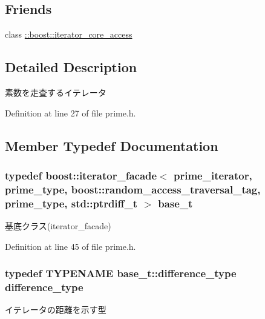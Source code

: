 \subsection*{\-Friends}
\begin{DoxyCompactItemize}
\item 
class \hyperlink{classyuh_1_1range__detail_1_1prime__iterator_a986bf0deaa7559f361d03122eeea4c86}{\-::boost\-::iterator\-\_\-core\-\_\-access}
\end{DoxyCompactItemize}


\subsection{\-Detailed \-Description}
素数を走査するイテレータ 

\-Definition at line 27 of file prime.\-h.



\subsection{\-Member \-Typedef \-Documentation}
\hypertarget{classyuh_1_1range__detail_1_1prime__iterator_af6bf48039295b29ac1f86bd776f4a29a}{
\subsubsection[{base\-\_\-t}]{\setlength{\rightskip}{0pt plus 5cm}typedef boost\-::iterator\-\_\-facade$<$ {\bf prime\-\_\-iterator}, {\bf prime\-\_\-type}, boost\-::random\-\_\-access\-\_\-traversal\-\_\-tag, {\bf prime\-\_\-type}, std\-::ptrdiff\-\_\-t $>$ {\bf base\-\_\-t}}}\label{d9/dc8/classyuh_1_1range__detail_1_1prime__iterator_af6bf48039295b29ac1f86bd776f4a29a}
基底クラス(iterator\-\_\-facade) 

\-Definition at line 45 of file prime.\-h.

\hypertarget{classyuh_1_1range__detail_1_1prime__iterator_a18e7411e8bb12bf0d225a2ed55ce31c8}{
\subsubsection[{difference\-\_\-type}]{\setlength{\rightskip}{0pt plus 5cm}typedef {\bf \-T\-Y\-P\-E\-N\-A\-M\-E} base\-\_\-t\-::difference\-\_\-type {\bf difference\-\_\-type}}}\label{d9/dc8/classyuh_1_1range__detail_1_1prime__iterator_a18e7411e8bb12bf0d225a2ed55ce31c8}
イテレータの距離を示す型 


